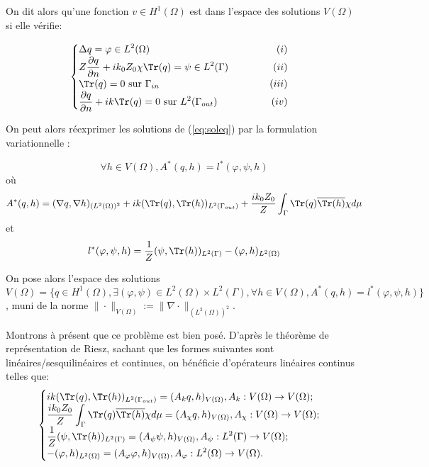 \begin{tcolorbox}[colback=blue!5!white,colframe=blue!75!black,title=Definition 4.3.1 : Espace des solutions]
On dit alors qu'une fonction $v\in H^1(\Omega)$ est dans l'espace des solutions $V(\Omega)$ si elle vérifie:

\begin{equation}
\label{eq:soleq}
    \begin{cases}
    \displaystyle \Delta q = \varphi \in L^2(\Omega) \hfill (i)
    \\
    \displaystyle Z\frac{\partial q}{\partial n} + ik_0Z_0\chi \Tr(q) = \psi \in L^2(\Gamma) \hfill \hspace{45pt} (ii)
    \\
    \displaystyle \Tr(q) = 0 \text{ sur } \Gamma_{in} \hfill (iii)
    \\
    \displaystyle \frac{\partial q}{\partial n} + ik \Tr(q) = 0 \text{ sur } L^2(\Gamma_{out}) \hfill (iv)
    \end{cases} 
\end{equation}

On peut alors réexprimer les solutions de (\ref{eq:soleq}) par la formulation variationnelle :

\[\forall h\in V(\Omega), A^*(q,h) = l^*(\varphi,\psi,h)\]
où
\[A^*(q,h) =  (\nabla q, \nabla h)_{(L^2(\Omega))^2}+ik(\Tr(q),\Tr(h))_{L^2(\Gamma_{out})}+\frac{ik_0Z_0}{Z}\int_\Gamma \Tr(q)\overline{\Tr(h)}\chi d\mu\]
et
\[l^*(\varphi,\psi,h) = \frac{1}{Z}(\psi, \Tr(h))_{L^2(\Gamma)} - (\varphi, h)_{L^2(\Omega)}\]

On pose alors l'espace des solutions $\displaystyle V(\Omega) = \{q\in H^1(\Omega), \exists (\varphi,\psi)\in L^2(\Omega)\times L^2(\Gamma), \forall h\in V(\Omega), A^*(q,h) = l^*(\varphi,\psi,h)\}$, muni de la norme $\displaystyle \|\cdot\|_{V(\Omega)}:= \|\nabla \cdot\|_{(L^2(\Omega))^2}$. \\

\end{tcolorbox}

Montrons à présent que ce problème est bien posé. D'après le théorème de représentation de Riesz, sachant que les formes suivantes sont linéaires/sesquilinéaires et continues, on bénéficie d'opérateurs linéaires continus telles que:
\[\begin{cases}
    \displaystyle ik(\Tr(q),\Tr(h))_{L^2(\Gamma_{out})} = (A_{k}q, h)_{V(\Omega)}, A_k:V(\Omega)\to V(\Omega);
    \\
    \displaystyle \frac{ik_0Z_0}{Z}\int_\Gamma \Tr(q)\overline{\Tr(h)}\chi d\mu = (A_{\chi}q, h)_{V(\Omega)}, A_\chi:V(\Omega)\to V(\Omega);
    \\
    \displaystyle \frac{1}{Z}(\psi, \Tr(h))_{L^2(\Gamma)} = (A_{\psi}\psi, h)_{V(\Omega)}, A_{\psi}:L^2(\Gamma)\to V(\Omega);
    \\
    \displaystyle - (\varphi, h)_{L^2(\Omega)} = (A_{\varphi}\varphi, h)_{V(\Omega)}, A_{\varphi}:L^2(\Omega)\to V(\Omega).
\end{cases}\]


